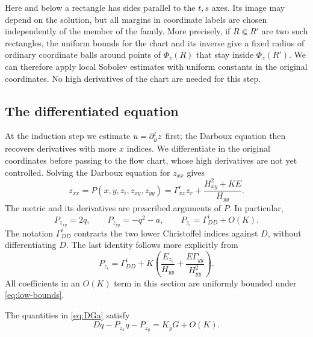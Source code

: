 Here and below a rectangle has sides parallel to the \(t,s\) axes.
Its image may depend on the solution, but all margins in coordinate
labels are chosen independently of the member of the family.
More precisely, if \(R\Subset R'\) are two such rectangles, the
uniform bounds for the chart and its inverse give a fixed radius
of ordinary coordinate balls around points of \(\Phi_z(R)\)
that stay inside \(\Phi_z(R')\). We can therefore apply local
Sobolev estimates with uniform constants in the original coordinates.
No high derivatives of the chart are needed for this step.

\subsection{The differentiated equation}

At the induction step we estimate \(u=\partial_y^lz\) first; the
Darboux equation then recovers derivatives with more \(x\) indices.
We differentiate in the original coordinates before passing to
the flow chart, whose high derivatives are not yet controlled.
Solving the Darboux equation for \(z_{xx}\) gives
\begin{equation}\label{eq:P}
z_{xx}=P(x,y,z_i,z_{xy},z_{yy})
=\Gamma^r_{xx}z_r+\frac{H_{xy}^2+KE}{H_{yy}}.
\end{equation}
The metric and its derivatives are prescribed arguments of \(P\).
In particular,
\begin{equation}\label{eq:P-partials}
P_{z_{xy}}=2q,\qquad P_{z_{yy}}=-q^2-a,\qquad
P_{z_i}=\Gamma^i_{DD}+O(K).
\end{equation}
The notation \(\Gamma^i_{DD}\) contracts the two lower Christoffel
indices against \(D\), without differentiating \(D\).
The last identity follows more explicitly from
\[
P_{z_i}=\Gamma^i_{DD}
+K\left(\frac{E_{z_i}}{H_{yy}}
+\frac{E\Gamma^i_{yy}}{H_{yy}^2}\right).
\]
All coefficients in an \(O(K)\) term in this section are uniformly
bounded under \eqref{eq:low-bounds}.

\begin{lemma}\label{lem:drift}
The quantities in \eqref{eq:DGa} satisfy
\begin{equation}\label{eq:drift}
Dq-P_{z_x}q-P_{z_y}=K_yG+O(K).
\end{equation}
\end{lemma}

